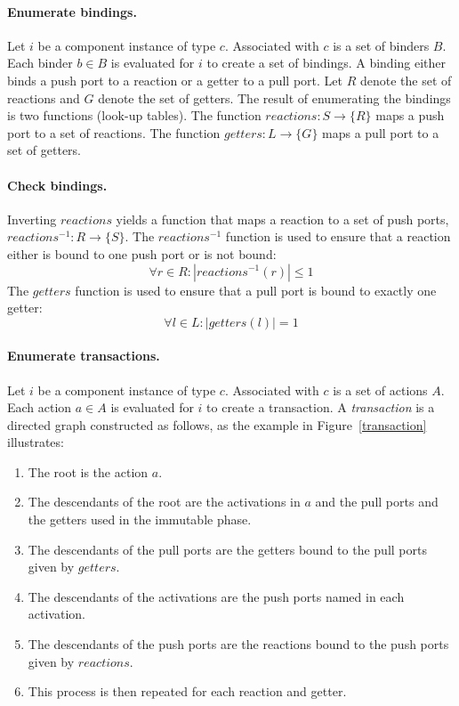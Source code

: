 \paragraph{Enumerate bindings.}
Let $i$ be a component instance of type $c$.
Associated with $c$ is a set of binders $B$.
Each binder $b \in B$ is evaluated for $i$ to create a set of bindings.
A binding either binds a push port to a reaction or a getter to a pull port.
Let $R$ denote the set of reactions and $G$ denote the set of getters.
The result of enumerating the bindings is two functions (look-up tables).
The function $\mathit{reactions}: S \to \{ R \}$ maps a push port to a set of reactions.
The function $\mathit{getters}: L \to \{ G \}$ maps a pull port to a set of getters.

\paragraph{Check bindings.}
Inverting $\mathit{reactions}$ yields a function that maps a reaction to a set of push ports, $\mathit{reactions}^{-1}: R \to \{ S \}$.
The $\mathit{reactions}^{-1}$ function is used to ensure that a reaction either is bound to one push port or is not bound:
\begin{displaymath}
\forall r \in R : |\mathit{reactions}^{-1} (r)| \leq 1
\end{displaymath}
The $\mathit{getters}$ function is used to ensure that a pull port is bound to exactly one getter:
\begin{displaymath}
\forall l \in L : |\mathit{getters} (l)| = 1
\end{displaymath}

\paragraph{Enumerate transactions.}
Let $i$ be a component instance of type $c$.
Associated with $c$ is a set of actions $A$.
Each action $a \in A$ is evaluated for $i$ to create a transaction.
A \emph{transaction} is a directed graph constructed as follows, as the example in Figure~\ref{transaction} illustrates:
\begin{enumerate}
\item The root is the action $a$.
\item The descendants of the root are the activations in $a$ and the pull ports and the getters used in the immutable phase.
\item The descendants of the pull ports are the getters bound to the pull ports given by $\mathit{getters}$.
\item The descendants of the activations are the push ports named in each activation.
\item The descendants of the push ports are the reactions bound to the push ports given by $\mathit{reactions}$.
\item This process is then repeated for each reaction and getter.
\end{enumerate}

